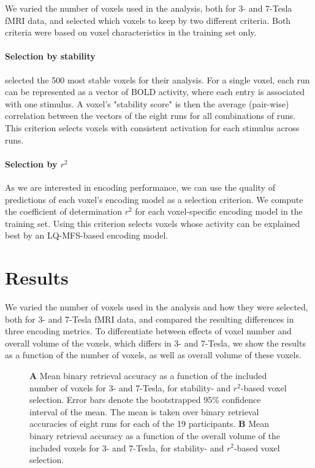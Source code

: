 We varied the number of voxels used in the analysis, both for 3- and 7-Tesla
f{MRI} data, and selected which voxels to keep by two different criteria. Both
criteria were based on voxel characteristics in the training set only.

\paragraph{Selection by stability}

\citet{ML08} selected the 500 most stable voxels for their analysis. For a
single voxel, each run can be represented as a vector of BOLD activity, where
each entry is associated with one stimulus. A voxel's "stability score" is then
the average (pair-wise) correlation between the vectors of the eight runs for
all combinations of runs.  This criterion selects voxels with consistent
activation for each stimulus across runs.

\paragraph{Selection by $r^2$}

As we are interested in encoding performance, we can use the quality of
predictions of each voxel's encoding model as a selection criterion. We compute
the coefficient of determination $r^2$ for each voxel-specific encoding model
in the training set. Using this criterion selects voxels whose activity can be
explained best by an LQ-MFS-based encoding model.

\section*{Results}

We varied the number of voxels used in the analysis and how they were selected,
both for 3- and 7-Tesla f{MRI} data, and compared the resulting differences in
three encoding metrics. To differentiate between effects of voxel number and
overall volume of the voxels, which differs in 3- and 7-Tesla, we show the
results as a function of the number of voxels, as well as overall volume of
these voxels.

\begin{figure}
  \centering
  \def\svgwidth{\linewidth}
  
	
  \caption{\textbf{A} Mean binary retrieval accuracy as a function of the
  included number of voxels for 3- and 7-Tesla, for stability- and $r^2$-based
  voxel selection. Error bars denote the bootstrapped 95\% confidence interval
  of the mean. The mean is taken over binary retrieval accuracies of eight runs
  for each of the 19 participants. \textbf{B} Mean binary retrieval accuracy as
a function of the overall volume of the included voxels for 3- and 7-Tesla, for
stability- and $r^2$-based voxel selection.}

 \label{fig:binary_retrieval}
\end{figure}

